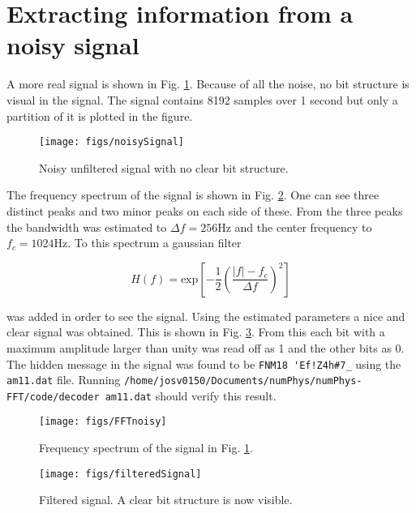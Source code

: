 \section{Extracting information from a noisy signal}

A more real signal is shown in Fig. \ref{fig:noisySignal}. Because of all the noise, no bit structure is visual in the signal. The signal contains 8192 samples over 1 second but only a partition of it is plotted in the figure.

\begin{figure}[H]
  \centering
  \texttt{[image: figs/noisySignal]}
  \caption{Noisy unfiltered signal with no clear bit structure.}
  \label{fig:noisySignal}
\end{figure}

The frequency spectrum of the signal is shown in Fig. \ref{fig:FFTnoisy}. One can see three distinct peaks and two minor peaks on each side of these. From the three peaks the bandwidth was estimated to $\Delta f = 256$Hz and the center frequency to $f_c = 1024$Hz. To this spectrum a gaussian filter

\begin{equation}
  \label{eq:gaussfilt}
  H(f) = \text{exp}\left[-\frac{1}{2}\left(\frac{|f|-f_c}{\Delta f}\right)^2\right]
\end{equation}

was added in order to see the signal. Using the estimated parameters a nice and clear signal was obtained. This is shown in Fig. \ref{fig:filteredSignal}. From this each bit with a maximum amplitude larger than unity was read off as 1 and the other bits as 0. The hidden message in the signal was found to be \verb|FNM18 'Ef!Z4h#7_| using the \verb|am11.dat| file. Running \verb|/home/josv0150/Documents/numPhys/numPhys-FFT/code/decoder am11.dat| should verify this result.

\begin{figure}[H]
  \centering
  \texttt{[image: figs/FFTnoisy]}
  \caption{Frequency spectrum of the signal in Fig. \ref{fig:noisySignal}.}
  \label{fig:FFTnoisy}
\end{figure}

\begin{figure}[H]
  \centering
  \texttt{[image: figs/filteredSignal]}
  \caption{Filtered signal. A clear bit structure is now visible.}
  \label{fig:filteredSignal}
\end{figure}
